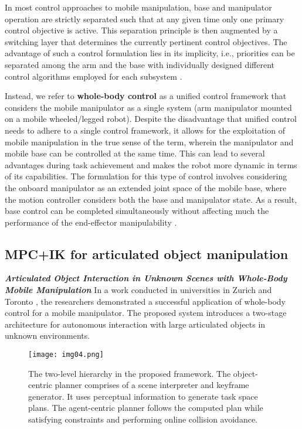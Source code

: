 In most control approaches to mobile manipulation, base and manipulator operation are strictly
separated such that at any given time only one primary control objective is
active. This separation principle is then augmented by a switching layer that determines the
currently pertinent control objectives. The advantage of such a control formulation lies in its
implicity, i.e., priorities can be separated among the arm and the base with individually
designed different control algorithms employed for each subsystem \cite{thakar2023survey}.

Instead, we refer to \textbf{whole-body control} as a unified control framework that considers
the mobile manipulator as a single system (arm manipulator mounted on a mobile wheeled/legged robot).
Despite the disadvantage that unified control needs to adhere to a single control framework,
it allows for the exploitation of mobile manipulation in the true sense of the term,
wherein the manipulator and mobile base can be controlled at the same time. This can lead
to several advantages during task achievement and makes the robot more dynamic in terms
of its capabilities. The formulation for this type of control involves considering
the onboard manipulator as an extended joint space of the mobile base, where the motion controller
considers both the base and manipulator state. As a result, base control can be completed
simultaneously without affecting much the performance of the end-effector manipulability
\cite{thakar2023survey}.

\subsection{MPC+IK for articulated object manipulation}

\textbf{\textit{Articulated Object Interaction in Unknown Scenes
with Whole-Body Mobile Manipulation}} \quad
In a work conducted in universities in Zurich and Toronto \cite{mittal2022articulated},
the researchers demonstrated a successful application of whole-body control for a mobile
manipulator. The proposed system introduces a two-stage architecture for autonomous interaction
with large articulated objects in unknown environments.

\begin{figure}[H]
	\centering
	\texttt{[image: img04.png]}
	\captionsetup{width=0.9\linewidth}
	\caption{ The two-level hierarchy in the proposed framework. The
		object-centric planner comprises of a scene interpreter and keyframe
		generator. It uses perceptual information to generate task space
		plans. The agent-centric planner follows the computed plan while
		satisfying constraints and performing online collision avoidance.
		\cite{mittal2022articulated}}
	\label{fig:img04}
\end{figure}



